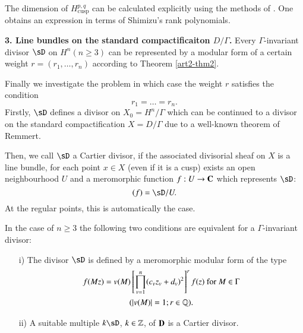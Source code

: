 \begin{remark*}
The dimension of $H^{p,q}_{\text{cusp}}$ can be calculated explicitly using the methods of \cite{art2-key1}. One obtains an expression in terms of Shimizu's rank polynomials.
\end{remark*}

\medskip
\noindent
\textbf{3. Line bundles on the standard compactificaiton $D/\Gamma$.} Every $\Gamma$-invariant divisor $\sD$ on $H^n (n \geqslant 3)$ can be represented by a modular form of a certain weight $r = (r_1, \ldots, r_n)$ according to Theorem \ref{art2-thm2}.

Finally we investigate the problem in which case the weight $r$ satisfies the condition
$$
r_1 = \ldots = r_n.
$$
Firstly, $\sD$ defines a divisor on $X_0=H^n/\Gamma$ which can be continued to a divisor on the standard compactification $X = D/\Gamma$ due to a well-known theorem of Remmert.

Then, we call $\sD$ a Cartier divisor, if the associated divisorial sheaf on $X$ is a line bundle, \ie for each point $x \in X$ (even if it is a cusp) exists an open neighbourhood $U$ and a meromorphic function $f:U \to \mathbf{C}$ which represents $\sD$:
$$
(f) = \sD/U.
$$
At the regular points, this is automatically the case.

\begin{thm}\label{art2-thm6}
In the case of $n \geqslant 3$ the following two conditions are equivalent for a $\Gamma$-invariant divisor:
\begin{itemize}
\item[i)] The divisor $\sD$ is defined by a meromorphic modular form of the type
\begin{multline*}
f(Mz) = v(M) \left[\prod^n_{v=1} (c_v z_v + d_v)^2 \right]^r f(z) \text{ for } M \in \Gamma \\
(|v(M)| = 1; r \in \mathbb{Q}).
\end{multline*}

\item[ii)] A suitable multiple $k \sD$, $k \in \mathbb{Z}$, of $\mathbf{D}$ is a Cartier divisor.
\end{itemize}
\end{thm}

